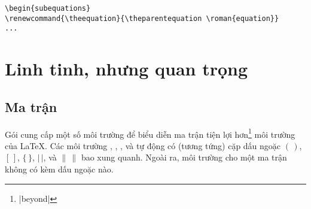 \medskip
\begin{verbatim}
\begin{subequations}
\renewcommand{\theequation}{\theparentequation \roman{equation}}
...
\end{verbatim}


\chapter{Linh tinh, nhưng quan trọng}

\section{Ma trận}\label{ss:matrix}

Gói  cung cấp một số môi trường để biểu diễn ma trận
tiện lợi hơn\footnote{|beyond|} môi trường  của \LaTeX{}.
Các môi trường , , , 
và  tự động có (tương tứng) cặp dấu ngoặc $(\,)$, $[\,]$,
$\lbrace\,\rbrace$,
$\lvert\,\rvert$, và $\lVert\,\rVert$ bao xung quanh.
Ngoài ra, môi trường  cho một ma trận không có kèm dấu ngoặc nào.

